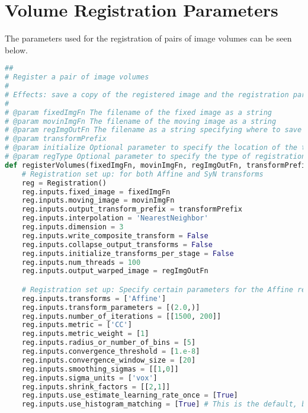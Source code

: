 \chapter{Volume Registration Parameters}
\label{appendix:registration-params}

The parameters used for the registration of pairs of image volumes can be seen below.

\begin{lstlisting}[language=Python]
##
# Register a pair of image volumes
#
# Effects: save a copy of the registered image and the registration parameters
#
# @param fixedImgFn The filename of the fixed image as a string
# @param movinImgFn The filename of the moving image as a string
# @param regImgOutFn The filename as a string specifying where to save the registered moving image
# @param transformPrefix 
# @param initialize Optional parameter to specify the location of the transform matrix from the previous registration
# @param regType Optional parameter to specify the type of registration to use (affine ['Affine'] or nonlinear ['Syn']) Default: nonlinear
def registerVolumes(fixedImgFn, movinImgFn, regImgOutFn, transformPrefix, initialize=None, regtype='nonlinear'):
    # Registration set up: for both Affine and SyN transforms
    reg = Registration()
    reg.inputs.fixed_image = fixedImgFn
    reg.inputs.moving_image = movinImgFn
    reg.inputs.output_transform_prefix = transformPrefix 
    reg.inputs.interpolation = 'NearestNeighbor'
    reg.inputs.dimension = 3
    reg.inputs.write_composite_transform = False 
    reg.inputs.collapse_output_transforms = False
    reg.inputs.initialize_transforms_per_stage = False
    reg.inputs.num_threads = 100
    reg.inputs.output_warped_image = regImgOutFn

    # Registration set up: Specify certain parameters for the Affine registration step
    reg.inputs.transforms = ['Affine']
    reg.inputs.transform_parameters = [(2.0,)]
    reg.inputs.number_of_iterations = [[1500, 200]] 
    reg.inputs.metric = ['CC'] 
    reg.inputs.metric_weight = [1]
    reg.inputs.radius_or_number_of_bins = [5] 
    reg.inputs.convergence_threshold = [1.e-8]
    reg.inputs.convergence_window_size = [20]
    reg.inputs.smoothing_sigmas = [[1,0]]
    reg.inputs.sigma_units = ['vox']
    reg.inputs.shrink_factors = [[2,1]]
    reg.inputs.use_estimate_learning_rate_once = [True]
    reg.inputs.use_histogram_matching = [True] # This is the default, but specify it anyway


\end{lstlisting}

